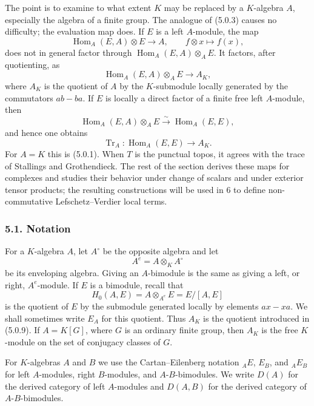 \documentclass[11pt]{article}
\theoremstyle{plain}
\theoremstyle{definition}
\theoremstyle{remark}
\DeclareMathOperator{\Hom}{Hom}
\DeclareMathOperator{\Tr}{Tr}
\begin{document}
The point is to examine to what extent $K$ may be replaced by a $K$-algebra $A$, especially the algebra of a finite group. The analogue of (5.0.3) causes no difficulty; the evaluation map does. If $E$ is a left $A$-module, the map
\[
   \Hom_A(E,A)\otimes E\to A,
   \qquad f\otimes x\mapsto f(x),
\]
does not in general factor through $\Hom_A(E,A)\otimes_AE$. It factors, after quotienting, as
\begin{equation}
   \Hom_A(E,A)\otimes_AE\to A_K,                                  \tag{5.0.9}
\end{equation}
where $A_K$ is the quotient of $A$ by the $K$-submodule locally generated by the commutators $ab-ba$. If $E$ is locally a direct factor of a finite free left $A$-module, then
\begin{equation}
   \Hom_A(E,A)\otimes_AE\xrightarrow{\sim}\Hom_A(E,E),              \tag{5.0.10}
\end{equation}
and hence one obtains
\begin{equation}
   \Tr_A:\Hom_A(E,E)\to A_K.                                      \tag{5.0.11}
\end{equation}
For $A=K$ this is (5.0.1). When $T$ is the punctual topos, it agrees with the trace of Stallings and Grothendieck. The rest of the section derives these maps for complexes and studies their behavior under change of scalars and under exterior tensor products; the resulting constructions will be used in 6 to define non-commutative Lefschetz--Verdier local terms.

\subsubsection*{5.1. Notation}
For a $K$-algebra $A$, let $A^{\circ}$ be the opposite algebra and let
\[
   A^e=A\otimes_KA^{\circ}
\]
be its enveloping algebra. Giving an $A$-bimodule is the same as giving a left, or right, $A^e$-module. If $E$ is a bimodule, recall that
\[
   H_0(A,E)=A\otimes_{A^e}E=E/[A,E]
\]
is the quotient of $E$ by the submodule generated locally by elements $ax-xa$. We shall sometimes write $E_A$ for this quotient. Thus $A_K$ is the quotient introduced in (5.0.9). If $A=K[G]$, where $G$ is an ordinary finite group, then $A_K$ is the free $K$-module on the set of conjugacy classes of $G$.

For $K$-algebras $A$ and $B$ we use the Cartan--Eilenberg notation ${}_AE$, $E_B$, and ${}_AE_B$ for left $A$-modules, right $B$-modules, and $A$-$B$-bimodules. We write $D(A)$ for the derived category of left $A$-modules and $D(A,B)$ for the derived category of $A$-$B$-bimodules.
\end{document}
